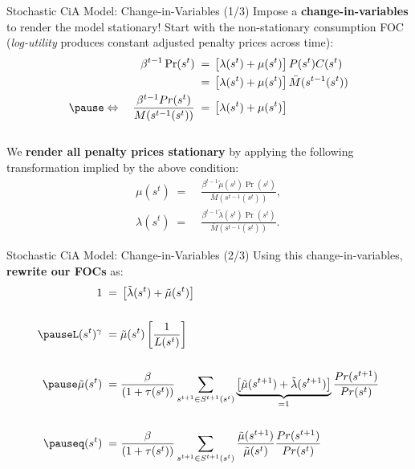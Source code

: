 \documentclass[10pt,c,aspectratio=1610,handout]{beamer}
\begin{document}
\begin{frame}{Stochastic CiA Model: Change-in-Variables (1/3)}%
  Impose a \textbf{change-in-variables} to render the model stationary! Start with the non-stationary consumption FOC (\emph{log-utility} produces constant adjusted penalty prices across time):%
  \begin{align*}%
    \beta^{t-1}\Pr (s^{t}) \; = & \; \left[ \lambda (s^{t})+\mu(s^{t})\right] P(s^t) C(s^t)\\%
     = & \; \left[ \lambda (s^{t})+\mu(s^{t})\right] \bar M(s^{t-1}(s^t))\\%
     \pause%
    \Leftrightarrow \quad \frac{\beta^{t-1} Pr(s^t)}{M(s^{t-1}(s^t))} \; = & \; \left[ \lambda (s^{t})+\mu(s^{t})\right]%
  \end{align*}\\%
  \vspace*{0.15in}%
  \pause%
  We \textbf{render all penalty prices stationary} by applying the following transformation implied by the above condition:%
  \begin{align*}
    \mu (s^{t}) \; = & \; \frac{\beta ^{t-1}\tilde{\mu}(s^{t})\Pr (s^{t})}{\bar{M}(s^{t-1}(s^{t}))},\\%
    \lambda (s^{t}) \; = & \; \frac{\beta ^{t-1}\tilde{\lambda}(s^{t})\Pr (s^{t})}{\bar{M}(s^{t-1}(s^{t}))}.%
  \end{align*}%
\end{frame}%
\begin{frame}{Stochastic CiA Model: Change-in-Variables (2/3)}%
  Using this change-in-variables, \textbf{rewrite our FOCs} as:%
  \begin{align}%
    1 \; = & \; \left[ \tilde{\lambda}(s^{t}) + \tilde{\mu}(s^{t}) \right]\\%
    \notag \\%
    \pause%
    L(s^{t})^{\gamma} \; = & \; \tilde{\mu}(s^{t}) \left[ \frac{1}{L(s^{t})} \right]\\%
    \notag \\%
    \pause%
    \tilde{\mu}(s^{t}) \; = & \; \frac{\beta}{(1+\tau(s^{t}))} \sum_{s^{t+1}\in S^{t+1}(s^{t})} \underbrace{\left[ \tilde{\mu}(s^{t+1})+\tilde{\lambda}(s^{t+1})\right]}_{=1} \frac{Pr(s^{t+1})}{Pr(s^{t})}\\%
    \notag \\%
    \pause%
     q(s^{t}) \; = & \; \frac{\beta}{(1+\tau(s^{t}))} \sum_{s^{t+1}\in S^{t+1}(s^{t})} \frac{\tilde{\mu}(s^{t+1})}{\tilde{\mu}(s^{t})} \frac{Pr(s^{t+1})}{Pr(s^{t})}%
  \end{align}%
\end{frame}%
\end{document}
